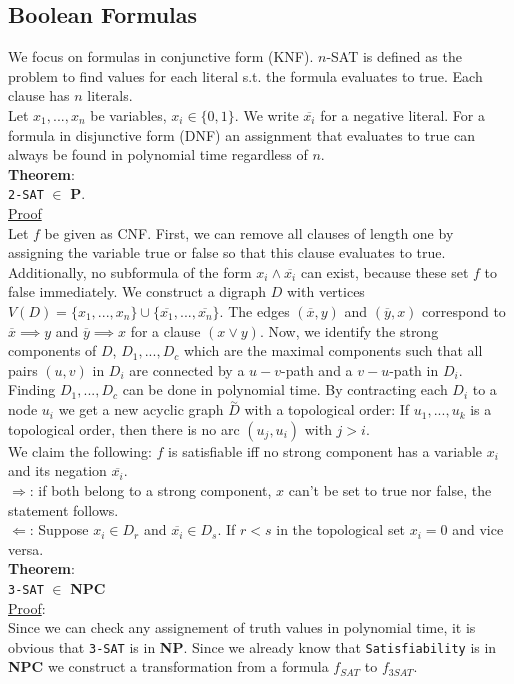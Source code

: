 \documentclass[a4paper, 12pt]{article}
\begin{document}
	\subsection{Boolean Formulas}
	We focus on formulas in conjunctive form (KNF). $n$-SAT is defined as the problem to find values for each literal s.t. the formula evaluates to true. Each clause has $n$ literals.\\
	Let $x_1,...,x_n$ be variables, $x_i \in \{0,1\}$. We write $\overline{x_i}$ for a negative literal. For a formula in disjunctive form (DNF) an assignment that evaluates to true can always be found in polynomial time regardless of $n$.\\
	\textbf{Theorem}:\\
	\texttt{2-SAT} $\in$ \textbf{P}.\\
	\underline{Proof}\\
	Let $f$ be given as CNF. First, we can remove all clauses of length one by assigning the variable true or false so that this clause evaluates to true. Additionally, no subformula of the form $x_i \land \overline{x_i}$ can exist, because these set $f$ to false immediately. We construct a digraph $D$ with vertices $V(D) = \{x_1,...,x_n\} \cup \{\overline{x_1},...,\overline{x_n}\}$. The edges $(\overline{x}, y)$ and $(\overline{y}, x)$ correspond to $\overline{x} \implies y$ and $\overline{y} \implies x$ for a clause $(x\lor y)$. Now, we identify the strong components of $D$, $D_1,...,D_c$ which are the maximal components such that all pairs $(u,v)$ in $D_i$ are connected by a $u-v$-path and a $v-u$-path in $D_i$. Finding $D_1,...,D_c$ can be done in polynomial time. By contracting each $D_i$ to a node $u_i$ we get a new acyclic graph $\overset{\sim}{D}$ with a topological order: If $u_1,...,u_k$ is a topological order, then there is no arc $(u_j,u_i)$ with $j>i$.\\
	We claim the following: $f$ is satisfiable iff no strong component has a variable $x_i$ and its negation $\overline{x_i}$.\\
	$\Rightarrow$: if both belong to a strong component, $x$ can't be set to true nor false, the statement follows.\\
	$\Leftarrow$: Suppose $x_i \in D_r$ and $\overline{x_i} \in D_s$. If $r<s$ in the topological set $x_i = 0$ and vice versa.\\
	\textbf{Theorem}:\\
	\texttt{3-SAT} $\in$ \textbf{NPC}\\
	\underline{Proof}:\\
	Since we can check any assignement of truth values in polynomial time, it is obvious that \texttt{3-SAT} is in \textbf{NP}. Since we already know that \texttt{Satisfiability} is in \textbf{NPC} we construct a transformation from a formula $f_{SAT}$ to $f_{3SAT}$.\\
\end{document}
